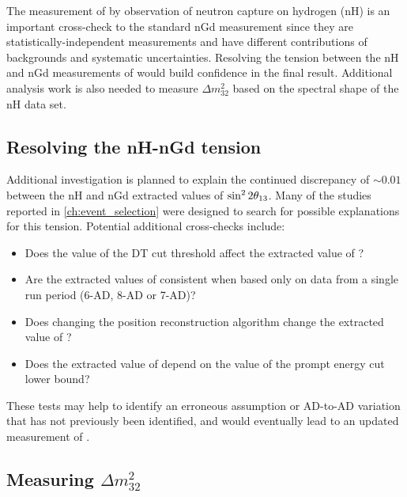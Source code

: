The measurement of \thetaot{} by observation of neutron capture on hydrogen (nH)
is an important cross-check to the standard nGd measurement
since they are statistically-independent measurements and
have different contributions of backgrounds and systematic uncertainties.
Resolving the tension between the nH and nGd measurements of \thetaot{}
would build confidence in the final result.
Additional analysis work is also needed to measure $\Delta m^2_{32}$
based on the spectral shape of the nH data set.

\subsection{Resolving the nH-nGd tension}
\label{subsec:tension}

Additional investigation is planned to explain the continued discrepancy
of $\sim0.01$ between the nH and nGd extracted values of $\sin^22\theta_{13}$.
Many of the studies reported in \cref{ch:event_selection}
were designed to search for possible explanations for this tension.
Potential additional cross-checks include:
\begin{itemize}
    \item Does the value of the DT cut threshold affect the extracted value of
        \thetaot{}?
    \item Are the extracted values of \thetaot{} consistent when
        based only on data from a single run period (6-AD, 8-AD or 7-AD)?
    \item Does changing the position reconstruction algorithm
        change the extracted value of \thetaot{}?
    \item Does the extracted value of \thetaot{} depend on
        the value of the prompt energy cut lower bound?
\end{itemize}
These tests may help to identify an erroneous assumption
or AD-to-AD variation that has not previously been identified,
and would eventually lead to an updated measurement of \thetaot{}.


\subsection{Measuring \texorpdfstring{$\Delta m^2_{32}$}{the 3,2 mass splitting}}
\label{subsec:rateplusshape}

